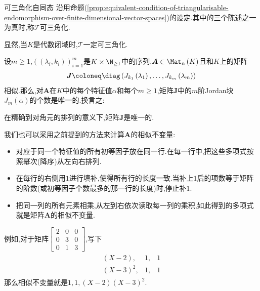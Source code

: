 \begin{definition}{可三角化自同态}{}
	沿用命题(\cref{prop:equivalent-condition-of-triangularisable-endomorphism-over-finite-dimensional-vector-spaces})的设定.其中的三个陈述之一为真时,称$\mathcal{T}$可三角化.
\end{definition}

\begin{remark}{}{}
	显然,当$K$是代数闭域时,$\mathcal{T}$一定可三角化.
\end{remark}

\begin{remark}{}{}
	设$m\geq 1$,$\left(\left(\lambda_{i},k_{i}\right)\right)_{i=1}^{m}$是$K\times\N_{\geq 1}$中的序列,$\boldsymbol{A}\in\Mat_{n}\left(K\right)$且和$K$上的矩阵
	\begin{align*}
		\boldsymbol{J}\coloneq\diag\left(J_{k_{1}}\left(\lambda_{1}\right),\ldots,J_{k_{m}}\left(\lambda_{m}\right)\right)
	\end{align*}
	相似.那么,对$\boldsymbol{A}$在$K$中的每个特征值$\alpha$和每个$m\geq 1$,矩阵$\boldsymbol{J}$中的$m$阶Jordan块$J_{m}\left(\alpha\right)$的个数是唯一的.换言之:
	\begin{center}
		在精确到对角元的排列的意义下,矩阵$\boldsymbol{J}$是唯一的.
	\end{center}
	
	我们也可以采用之前提到的方法来计算$\boldsymbol{A}$的相似不变量:
	\begin{itemize}
		\item 对应于同一个特征值的所有初等因子放在同一行.在每一行中,把这些多项式按照幂次(降序)从左向右排列.
		\item 在每行的右侧用$1$进行填补,使得所有行的长度一致.当补上$1$后的项数等于矩阵的阶数(或初等因子个数最多的那一行的长度)时,停止补$1$.
		\item 把同一列的所有元素相乘,从左到右依次读取每一列的乘积,如此得到的多项式就是矩阵$\boldsymbol{A}$的相似不变量.
	\end{itemize}
	例如,对于矩阵$
	\begin{bmatrix}
		2&0&0\\
		0&3&0\\
		0&1&3
	\end{bmatrix}$,写下
	\begin{gather*}
		\begin{array}{rrr}
			\left(X-2\right),&1,&1\\
			\left(X-3\right)^{2},&1,&1
		\end{array}
	\end{gather*}	
	那么相似不变量就是$1,1,(X-2)(X-3)^{2}$.
\end{remark}

